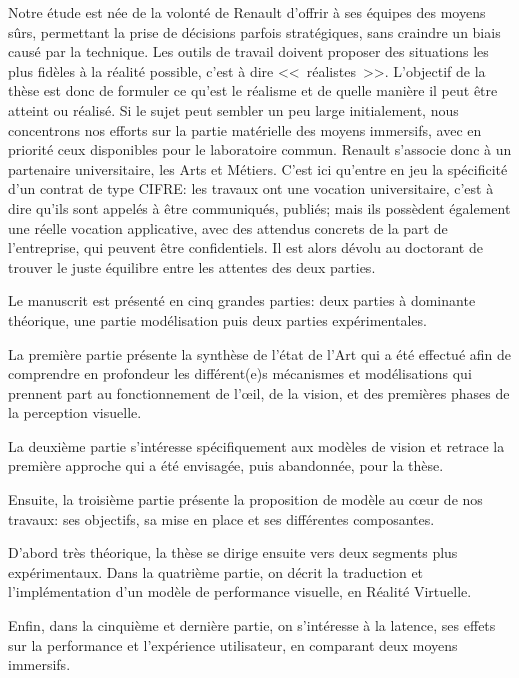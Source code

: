 \par Notre étude est née de la volonté de Renault d'offrir à ses équipes des moyens sûrs, permettant la prise de décisions parfois stratégiques, sans craindre un biais causé par la technique. Les outils de travail doivent proposer des situations les plus fidèles à la réalité possible, c'est à dire <<~réalistes~>>. L'objectif de la thèse est donc de formuler ce qu'est le réalisme et de quelle manière il peut être atteint ou réalisé. Si le sujet peut sembler un peu large initialement, nous concentrons nos efforts sur la partie matérielle des moyens immersifs, avec en priorité ceux disponibles pour le laboratoire commun. Renault s'associe donc à un partenaire universitaire, les Arts et Métiers. C'est ici qu'entre en jeu la spécificité d'un contrat de type CIFRE: les travaux ont une vocation universitaire, c'est à dire qu'ils sont appelés à être communiqués, publiés; mais ils possèdent également une réelle vocation applicative, avec des attendus concrets de la part de l'entreprise, qui peuvent être confidentiels. Il est alors dévolu au doctorant de trouver le juste équilibre entre les attentes des deux parties.

\par Le manuscrit est présenté en cinq grandes parties: deux parties à dominante théorique, une partie modélisation puis deux parties expérimentales.

\par La première partie présente la synthèse de l'état de l'Art qui a été effectué afin de comprendre en profondeur les différent(e)s mécanismes et modélisations qui prennent part au fonctionnement de l'œil, de la vision, et des premières phases de la perception visuelle.

\par La deuxième partie s'intéresse spécifiquement aux modèles de vision et retrace la première approche qui a été envisagée, puis abandonnée, pour la thèse.

\par Ensuite, la troisième partie présente la proposition de modèle au cœur de nos travaux: ses objectifs, sa mise en place et ses différentes composantes.

\par D'abord très théorique, la thèse se dirige ensuite vers deux segments plus expérimentaux. Dans la quatrième partie, on décrit la traduction et l'implémentation d'un modèle de performance visuelle, en Réalité Virtuelle.

\par Enfin, dans la cinquième et dernière partie, on s'intéresse à la latence, ses effets sur la performance et l'expérience utilisateur, en comparant deux moyens immersifs.
